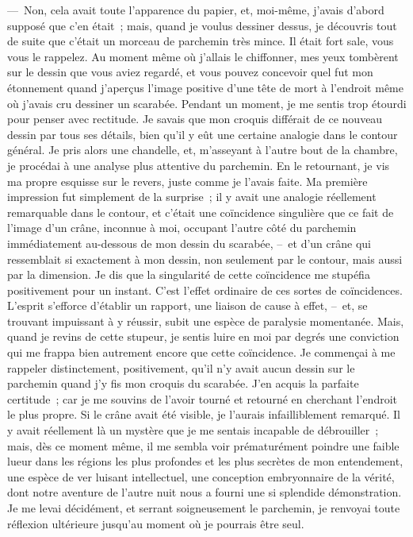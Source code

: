 \documentclass[french,twoside]{book} %
\begin{document}
— Non, cela avait toute l’apparence du papier, et, moi-même, j’avais d’abord supposé que c’en était ; mais, quand je voulus dessiner dessus, je découvris tout de suite que c’était un morceau de parchemin très mince. Il était fort sale, vous vous le rappelez. Au moment même où j’allais le chiffonner, mes yeux tombèrent sur le dessin que vous aviez regardé, et vous pouvez concevoir quel fut mon étonnement quand j’aperçus l’image positive d’une tête de mort à l’endroit même où j’avais cru dessiner un scarabée. Pendant un moment, je me sentis trop étourdi pour penser avec rectitude. Je savais que mon croquis différait de ce nouveau dessin par tous ses détails, bien qu’il y eût une certaine analogie dans le contour général. Je pris alors une chandelle, et, m’asseyant à l’autre bout de la chambre, je procédai à une analyse plus attentive du parchemin. En le retournant, je vis ma propre esquisse sur le revers, juste comme je l’avais faite. Ma première impression fut simplement de la surprise ; il y avait une analogie réellement remarquable dans le contour, et c’était une coïncidence singulière que ce fait de l’image d’un crâne, inconnue à moi, occupant l’autre côté du parchemin immédiatement au-dessous de mon dessin du scarabée, – et d’un crâne qui ressemblait si exactement à mon dessin, non seulement par le contour, mais aussi par la dimension. Je dis que la singularité de cette coïncidence me stupéfia positivement pour un instant. C’est l’effet ordinaire de ces sortes de coïncidences. L’esprit s’efforce d’établir un rapport, une liaison de cause à effet, – et, se trouvant impuissant à y réussir, subit une espèce de paralysie momentanée. Mais, quand je revins de cette stupeur, je sentis luire en moi par degrés une conviction qui me frappa bien autrement encore que cette coïncidence. Je commençai à me rappeler distinctement, positivement, qu’il n’y avait aucun dessin sur le parchemin quand j’y fis mon croquis du scarabée. J’en acquis la parfaite certitude ; car je me souvins de l’avoir tourné et retourné en cherchant l’endroit le plus propre. Si le crâne avait été visible, je l’aurais infailliblement remarqué. Il y avait réellement là un mystère que je me sentais incapable de débrouiller ; mais, dès ce moment même, il me sembla voir prématurément poindre une faible lueur dans les régions les plus profondes et les plus secrètes de mon entendement, une espèce de ver luisant intellectuel, une conception embryonnaire de la vérité, dont notre aventure de l’autre nuit nous a fourni une si splendide démonstration. Je me levai décidément, et serrant soigneusement le parchemin, je renvoyai toute réflexion ultérieure jusqu’au moment où je pourrais être seul.\par
\end{document}
